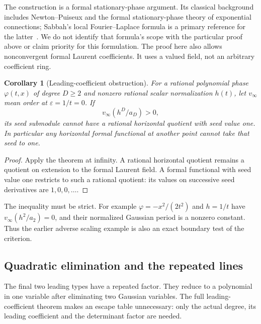 \documentclass[11pt]{article}
\newtheorem{corollary}[theorem]{Corollary}
\theoremstyle{definition}\newtheorem{definition}[theorem]{Definition}
\theoremstyle{remark}\newtheorem{remark}[theorem]{Remark}
\begin{document}
The construction is a formal stationary-phase argument. Its classical
background includes Newton--Puiseux and the formal stationary-phase
theory of exponential connections; Sabbah's local Fourier--Laplace
formula is a primary reference for the latter~\cite{SabbahStationary}.
We do not identify that formula's scope with the particular proof
above or claim priority for this formulation. The proof here also
allows nonconvergent formal Laurent coefficients. It uses a valued
field, not an arbitrary coefficient ring.

\begin{corollary}[Leading-coefficient obstruction]\label{cor:leadingobstruction}
For a rational polynomial phase $\varphi(t,x)$ of degree $D\geq2$
and nonzero rational scalar normalization $h(t)$, let $v_\infty$
mean order at $\varepsilon=1/t=0$. If
\begin{equation}\label{eq:leadingcriterion}
 v_\infty(h^D/a_D)>0,
\end{equation}
its seed submodule cannot have a rational horizontal quotient with
seed value one. In particular any horizontal formal functional at
another point cannot take that seed to one.
\end{corollary}
\begin{proof}
Apply the theorem at infinity. A rational horizontal quotient remains
a quotient on extension to the formal Laurent field. A formal
functional with seed value one restricts to such a rational quotient:
its values on successive seed derivatives are $1,0,0,\ldots$.
\end{proof}

The inequality must be strict. For example
$\varphi=-x^2/(2t^2)$ and $h=1/t$ have
$v_\infty(h^2/a_2)=0$, and their normalized Gaussian period is a
nonzero constant. Thus the earlier adverse scaling example is also
an exact boundary test of the criterion.

\subsection{Quadratic elimination and the repeated lines}
\label{sec:repeatedlines}

The final two leading types have a repeated factor. They reduce
to a polynomial in one variable after eliminating two Gaussian
variables. The full leading-coefficient theorem makes an escape
table unnecessary: only the actual degree, its leading
coefficient and the determinant factor are needed.
\end{document}
